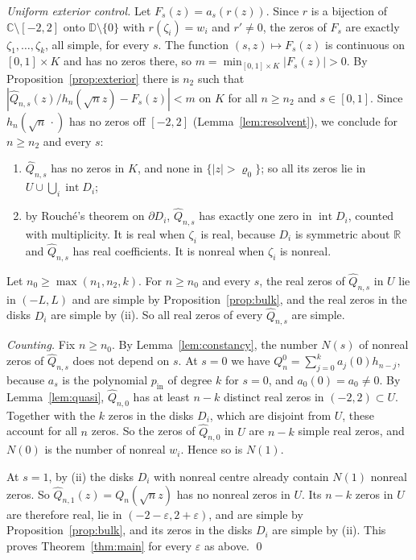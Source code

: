 \documentclass[11pt]{amsart}
\theoremstyle{definition}
\theoremstyle{remark}
\numberwithin{equation}{section}
\newcommand{\C}{\mathbb{C}}
\newcommand{\R}{\mathbb{R}}
\newcommand{\D}{\mathbb{D}}
\newcommand{\eps}{\varepsilon}
\begin{document}
\emph{Uniform exterior control.} Let $F_s(z)=a_s(r(z))$. Since $r$ is a bijection of $\C\setminus[-2,2]$ onto $\D\setminus\{0\}$ with $r(\zeta_i)=w_i$ and $r'\neq0$, the zeros of $F_s$ are exactly $\zeta_1,\dots,\zeta_k$, all simple, for every $s$. The function $(s,z)\mapsto F_s(z)$ is continuous on $[0,1]\times K$ and has no zeros there, so $m=\min_{[0,1]\times K}|F_s(z)|>0$. By Proposition~\ref{prop:exterior} there is $n_2$ such that $|\widehat Q_{n,s}(z)/h_n(\sqrt nz)-F_s(z)|<m$ on $K$ for all $n\ge n_2$ and $s\in[0,1]$. Since $h_n(\sqrt n\,\cdot)$ has no zeros off $[-2,2]$ (Lemma~\ref{lem:resolvent}), we conclude for $n\ge n_2$ and every $s$:
\begin{enumerate}
\item[(i)] $\widehat Q_{n,s}$ has no zeros in $K$, and none in $\{|z|>\varrho_0\}$; so all its zeros lie in $U\cup\bigcup_i\operatorname{int}D_i$;
\item[(ii)] by Rouch\'e's theorem on $\partial D_i$, $\widehat Q_{n,s}$ has exactly one zero in $\operatorname{int}D_i$, counted with multiplicity. It is real when $\zeta_i$ is real, because $D_i$ is symmetric about $\R$ and $\widehat Q_{n,s}$ has real coefficients. It is nonreal when $\zeta_i$ is nonreal.
\end{enumerate}
Let $n_0\ge\max(n_1,n_2,k)$. For $n\ge n_0$ and every $s$, the real zeros of $\widehat Q_{n,s}$ in $U$ lie in $(-L,L)$ and are simple by Proposition~\ref{prop:bulk}, and the real zeros in the disks $D_i$ are simple by (ii). So all real zeros of every $\widehat Q_{n,s}$ are simple.

\emph{Counting.} Fix $n\ge n_0$. By Lemma~\ref{lem:constancy}, the number $N(s)$ of nonreal zeros of $\widehat Q_{n,s}$ does not depend on $s$. At $s=0$ we have $Q_n^0=\sum_{j=0}^{k}a_j(0)h_{n-j}$, because $a_s$ is the polynomial $p_{\mathrm{in}}$ of degree $k$ for $s=0$, and $a_0(0)=a_0\ne0$. By Lemma~\ref{lem:quasi}, $\widehat Q_{n,0}$ has at least $n-k$ distinct real zeros in $(-2,2)\subset U$. Together with the $k$ zeros in the disks $D_i$, which are disjoint from $U$, these account for all $n$ zeros. So the zeros of $\widehat Q_{n,0}$ in $U$ are $n-k$ simple real zeros, and $N(0)$ is the number of nonreal $w_i$. Hence so is $N(1)$.

At $s=1$, by (ii) the disks $D_i$ with nonreal centre already contain $N(1)$ nonreal zeros. So $\widehat Q_{n,1}(z)=Q_n(\sqrt nz)$ has no nonreal zeros in $U$. Its $n-k$ zeros in $U$ are therefore real, lie in $(-2-\eps,2+\eps)$, and are simple by Proposition~\ref{prop:bulk}, and its zeros in the disks $D_i$ are simple by (ii). This proves Theorem~\ref{thm:main} for every $\eps$ as above. \qed
\end{document}

